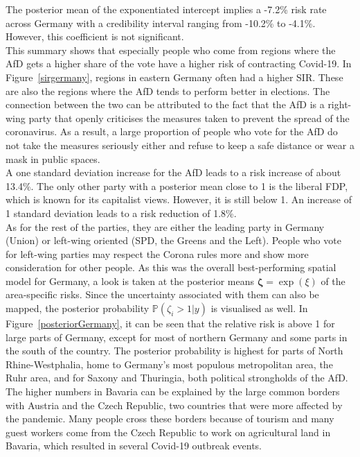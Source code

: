 The posterior mean of the exponentiated intercept implies a -7.2\% risk rate across Germany with a credibility interval ranging from -10.2\% to -4.1\%. However, this coefficient is not significant. \\
This summary shows that especially people who come from regions where the AfD gets a higher share of the vote have a higher risk of contracting Covid-19. In Figure~\ref{sirgermany}, regions in eastern Germany often had a higher SIR. These are also the regions where the AfD tends to perform better in elections. The connection between the two can be attributed to the fact that the AfD is a right-wing party that openly criticises the measures taken to prevent the spread of the coronavirus. As a result, a large proportion of people who vote for the AfD do not take the measures seriously either and refuse to keep a safe distance or wear a mask in public spaces. \\
A one standard deviation increase for the AfD leads to a risk increase of about 13.4\%. The only other party with a posterior mean close to 1 is the liberal FDP, which is known for its capitalist views. However, it is still below 1. An increase of 1 standard deviation leads to a risk reduction of 1.8\%. \\
As for the rest of the parties, they are either the leading party in Germany (Union) or left-wing oriented (SPD, the Greens and the Left). People who vote for left-wing parties may respect the Corona rules more and show more consideration for other people.
As this was the overall best-performing spatial model for Germany, a look is taken at the posterior means $\pmb{\zeta} = \exp{\left(\xi\right)}$ of the area-specific risks. Since the uncertainty associated with them can also be mapped, the posterior probability $\mathbb{P}\left(\zeta_i > 1|y\right)$ is visualised as well. In Figure~\ref{posteriorGermany}, it can be seen that the relative risk is above 1 for large parts of Germany, except for most of northern Germany and some parts in the south of the country. The posterior probability is highest for parts of North Rhine-Westphalia, home to Germany's most populous metropolitan area, the Ruhr area, and for Saxony and Thuringia, both political strongholds of the AfD. The higher numbers in Bavaria can be explained by the large common borders with Austria and the Czech Republic, two countries that were more affected by the pandemic. Many people cross these borders because of tourism and many guest workers come from the Czech Republic to work on agricultural land in Bavaria, which resulted in several Covid-19 outbreak events.

